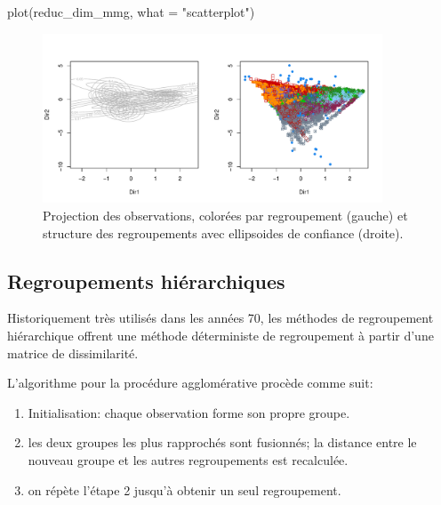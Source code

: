 \documentclass[
  11pt,
  letterpaper,
]{scrbook}
\newenvironment{Shaded}{\begin{snugshade}}{\end{snugshade}}
\newcommand{\AttributeTok}[1]{\textcolor[rgb]{0.40,0.45,0.13}{#1}}
\newcommand{\FunctionTok}[1]{\textcolor[rgb]{0.28,0.35,0.67}{#1}}
\newcommand{\NormalTok}[1]{\textcolor[rgb]{0.00,0.23,0.31}{#1}}
\newcommand{\StringTok}[1]{\textcolor[rgb]{0.13,0.47,0.30}{#1}}
\providecommand{\tightlist}{%
  \setlength{\itemsep}{0pt}\setlength{\parskip}{0pt}}\usepackage{longtable,booktabs,array}
\theoremstyle{definition}
\theoremstyle{remark}
\begin{document}
\begin{Shaded}
\begin{Highlighting}[]
\FunctionTok{plot}\NormalTok{(reduc\_dim\_mmg, }\AttributeTok{what =} \StringTok{"scatterplot"}\NormalTok{)}
\end{Highlighting}
\end{Shaded}

\begin{figure}[ht!]

{\centering \includegraphics[width=0.9\textwidth,height=\textheight]{regroupements_files/figure-pdf/fig-classifreducmclust-1.pdf}

}

\caption{\label{fig-classifreducmclust}Projection des observations,
colorées par regroupement (gauche) et structure des regroupements avec
ellipsoides de confiance (droite).}

\end{figure}

\hypertarget{regroupements-hiuxe9rarchiques}{%
\subsection{Regroupements
hiérarchiques}\label{regroupements-hiuxe9rarchiques}}

Historiquement très utilisés dans les années 70, les méthodes de
regroupement hiérarchique offrent une méthode déterministe de
regroupement à partir d'une matrice de dissimilarité.

L'algorithme pour la procédure agglomérative procède comme suit:

\begin{enumerate}
\def\labelenumi{\arabic{enumi}.}
\tightlist
\item
  Initialisation: chaque observation forme son propre groupe.
\item
  les deux groupes les plus rapprochés sont fusionnés; la distance entre
  le nouveau groupe et les autres regroupements est recalculée.
\item
  on répète l'étape 2 jusqu'à obtenir un seul regroupement.
\end{enumerate}
\end{document}
